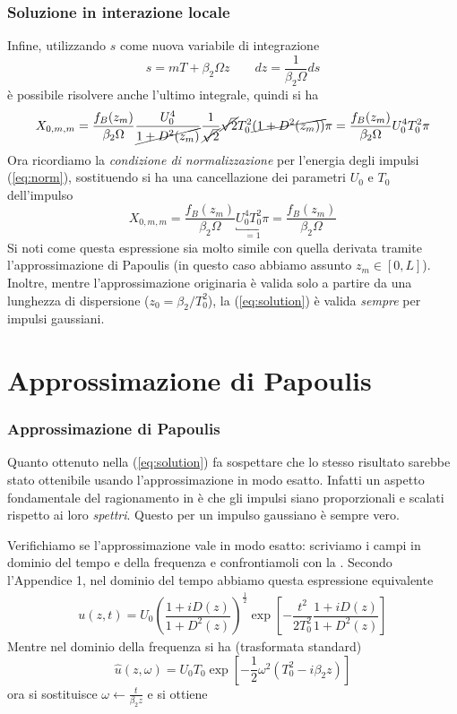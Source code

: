 \documentclass[8pt]{beamer} %
\begin{document}
\begin{frame}
	\frametitle {Soluzione in interazione locale}
	Infine, utilizzando $s$ come nuova variabile di integrazione
	\begin{equation}
		s = mT+\beta_2\Omega z  \qquad dz = \dfrac{1}{\beta_2\Omega}ds
	\end{equation}
	è possibile risolvere anche l'ultimo integrale, quindi si ha
	\begin{equation}
		X_{0, m, m} = \dfrac{f_B(z_m)}{\beta_2 \Omega} \dfrac{U_0^4}{\cancel{1+D^2(z_m)}} \dfrac{1}{\cancel{\sqrt{2}}} \cancel{\sqrt{2}} T_0^2 \cancel{(1+D^2(z_m))} \pi = \dfrac{f_B(z_m)}{\beta_2 \Omega} U_0^4 T_0^2 \pi
	\end{equation}
	Ora ricordiamo la \textit{condizione di normalizzazione} per l'energia degli impulsi (\ref{eq:norm}), sostituendo si ha una cancellazione dei parametri $U_0$ e $T_0$ dell'impulso
	\begin{equation}\label{eq:solution}
		X_{0, m, m} = \dfrac{f_B(z_m)}{\beta_2 \Omega} \underbracket{U_0^4 T_0^2 \pi}_{=1} = \dfrac{f_B(z_m)}{\beta_2 \Omega}
	\end{equation}
	Si noti come questa espressione sia molto simile con quella derivata tramite l'approssimazione di Papoulis \cite[eq. 10]{Dar_2013} (in questo caso abbiamo assunto $z_m \in [0, L]$).
	Inoltre, mentre l'approssimazione originaria è valida solo a partire da una lunghezza di dispersione ($z_0 = \beta_2/T_0^2$), la (\ref{eq:solution}) è valida \textit{sempre} per impulsi gaussiani.
\end{frame}


\section{Approssimazione di Papoulis}
\begin{frame}
	\frametitle{Approssimazione di Papoulis}
	Quanto ottenuto nella (\ref{eq:solution}) fa sospettare che lo stesso risultato sarebbe stato ottenibile usando l'approssimazione in modo esatto. Infatti un aspetto fondamentale del ragionamento in \cite{Dar_2013} è che gli impulsi siano proporzionali e scalati rispetto ai loro \textit{spettri}. Questo per un impulso gaussiano è sempre vero. 
	
	\vspace{20pt}
	Verifichiamo se l'approssimazione vale in modo esatto: scriviamo i campi in dominio del tempo e della frequenza e confrontiamoli con la \cite[eq. 10]{Dar_2013}. Secondo l'Appendice 1, nel dominio del tempo abbiamo questa espressione equivalente
	\begin{align}
		u(z, t) = U_0 \left(\dfrac{1+iD(z)}{1+D^2(z)}\right)^{\frac{1}{2}} \exp\left[-\dfrac{t^2}{2T_0^2} \dfrac{1+iD(z)}{1+D^2(z)}\right]
	\end{align}
	Mentre nel dominio della frequenza si ha (trasformata standard)
	\begin{equation}
		\hat{u}(z, \omega) = U_0 T_0 \exp\left[-\dfrac{1}{2} \omega^2 (T_0^2 - i\beta_2z)\right]	
	\end{equation}
	ora si sostituisce $\omega \leftarrow \frac{t}{\beta_2z}$ e si ottiene 
\end{frame}
\end{document}
